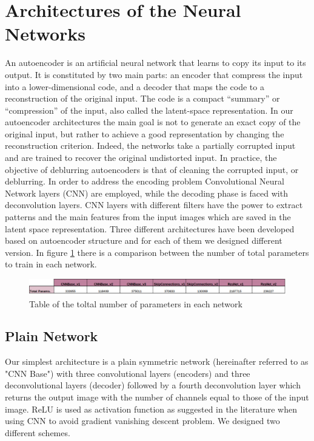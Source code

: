 \documentclass[12pt,a4paper]{article}
\begin{document}
\section{Architectures of the Neural Networks}
An autoencoder is an artificial neural network that learns to copy its input to its output. It is constituted by two main parts: an encoder that compress the input into a lower-dimensional code, and a decoder that maps the code to a reconstruction of the original input. The code is a compact “summary” or “compression” of the input, also called the latent-space representation. In our autoencoder architectures the main goal is not to generate an exact copy of the original input, but rather to achieve a good representation by changing the reconstruction criterion. Indeed, the networks take a partially corrupted input and are trained to recover the original undistorted input. In practice, the objective of deblurring autoencoders is that of cleaning the corrupted input, or deblurring. In order to address the encoding problem Convolutional Neural Network layers (CNN) are employed, while the decoding phase is faced with deconvolution layers. CNN layers with different filters have the power to extract patterns and the main features from the input images which are saved in the latent space representation. Three different architectures have been developed based on autoencoder structure and for each of them we designed different version. In figure \ref{table_params} there is a comparison between the number of total parameters to train in each network.

\begin{figure}[hbtp]
\centering
\includegraphics[scale=0.55]{params_table.png}
\caption{Table of the toltal number of parameters in each network}\label{table_params}
\end{figure}

\subsection{Plain Network}
Our simplest architecture is a plain symmetric network (hereinafter referred to as "CNN Base") with three convolutional layers (encoders) and three deconvolutional layers (decoder) followed by a fourth deconvolution layer which returns the output image with the number of channels equal to those of the input image. ReLU is used as activation function as suggested in the literature when using CNN to avoid gradient vanishing descent problem. We designed two different schemes. 
\end{document}
